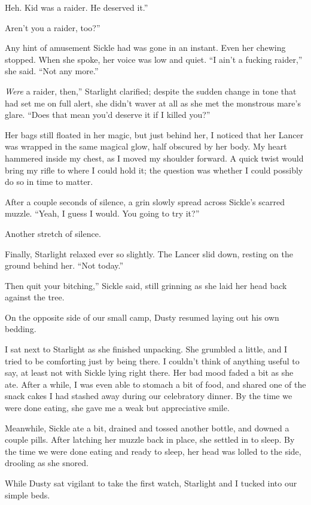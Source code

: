 \leavevmode{}Heh. Kid was a raider. He deserved it.”

\leavevmode{}Aren’t you a raider, too?”

Any hint of amusement Sickle had was gone in an instant. Even her chewing stopped. When she spoke, her voice was low and quiet. “I ain’t a fucking raider,” she said. “Not any more.”

\leavevmode{}\textit{Were} a raider, then,” Starlight clarified; despite the sudden change in tone that had set me on full alert, she didn’t waver at all as she met the monstrous mare’s glare. “Does that mean you’d deserve it if I killed you?”

Her bags still floated in her magic, but just behind her, I noticed that her Lancer was wrapped in the same magical glow, half obscured by her body. My heart hammered inside my chest, as I moved my shoulder forward. A quick twist would bring my rifle to where I could hold it; the question was whether I could possibly do so in time to matter.

After a couple seconds of silence, a grin slowly spread across Sickle’s scarred muzzle. “Yeah, I guess I would. You going to try it?”

Another stretch of silence.

Finally, Starlight relaxed ever so slightly. The Lancer slid down, resting on the ground behind her. “Not today.”

\leavevmode{}Then quit your bitching,” Sickle said, still grinning as she laid her head back against the tree.

On the opposite side of our small camp, Dusty resumed laying out his own bedding.

I sat next to Starlight as she finished unpacking. She grumbled a little, and I tried to be comforting just by being there. I couldn’t think of anything useful to say, at least not with Sickle lying right there. Her bad mood faded a bit as she ate. After a while, I was even able to stomach a bit of food, and shared one of the snack cakes I had stashed away during our celebratory dinner. By the time we were done eating, she gave me a weak but appreciative smile.

Meanwhile, Sickle ate a bit, drained and tossed another bottle, and downed a couple pills. After latching her muzzle back in place, she settled in to sleep. By the time we were done eating and ready to sleep, her head was lolled to the side, drooling as she snored.

While Dusty sat vigilant to take the first watch, Starlight and I tucked into our simple beds.

